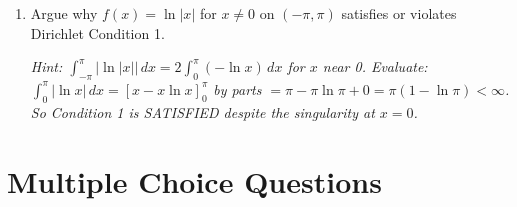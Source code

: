 \documentclass[12pt,a4paper]{article}
\begin{document}
\begin{enumerate}[label=\textbf{P\arabic*.}]
   \textit{Hint: Three smooth pieces, each bounded and integrable. Finitely many extrema. One potential jump at $x=0$ (check one-sided limits). Series converges to $0/2 = 0$ at $x=0$ if there is a jump.}

\item Argue why $f(x) = \ln|x|$ for $x \ne 0$ on $(-\pi,\pi)$ satisfies or violates Dirichlet Condition 1.

   \textit{Hint: $\int_{-\pi}^{\pi}|\ln|x||\,dx = 2\int_0^{\pi}(-\ln x)\,dx$ for $x$ near 0. Evaluate: $\int_0^{\pi}|\ln x|\,dx = [x - x\ln x]_0^{\pi}$ by parts $= \pi - \pi\ln\pi + 0 = \pi(1-\ln\pi) < \infty$. So Condition 1 is SATISFIED despite the singularity at $x=0$.}

\end{enumerate}

\section{Multiple Choice Questions}
\end{document}
